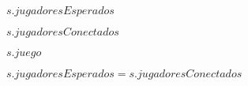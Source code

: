 \begin{algorithm}[H]
    \begin{algorithmic}[1]
        \State\Return$s.jugadoresEsperados$
    \end{algorithmic}
\end{algorithm}

\begin{algorithm}[H]
    \begin{algorithmic}[1]
        \State\Return$s.jugadoresConectados$
    \end{algorithmic}
\end{algorithm}

\begin{algorithm}[H]
    \begin{algorithmic}[1]
        \State\Return$s.juego$
    \end{algorithmic}
\end{algorithm}

\begin{algorithm}[H]
    \begin{algorithmic}[1]
        \State\Return$s.jugadoresEsperados=s.jugadoresConectados$
    \end{algorithmic}
\end{algorithm}
\newpage

